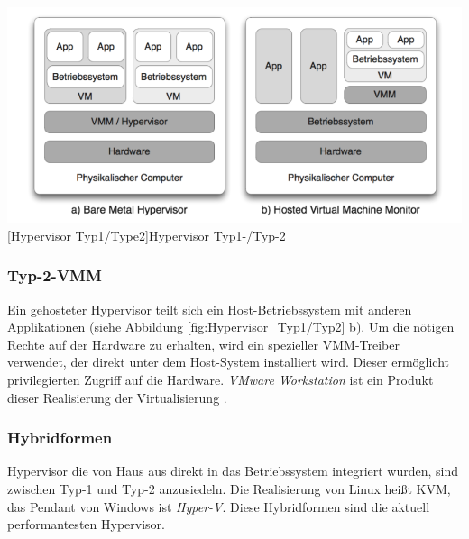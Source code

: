 \vspace{1em}
\begin{minipage}{\linewidth}
	\centering
	\includegraphics[width=1\linewidth]{pics/Hypervisoren.PNG}
	[Hypervisor Typ1/Type2]{Hypervisor Typ1-/Typ-2 \cite{Meinel2011VirtualisierungMarktubersicht} }
	\label{fig:Hypervisor_Typ1/Typ2}
\end{minipage}

\subsubsection{Typ-2-VMM}
Ein gehosteter Hypervisor teilt sich ein Host-Betriebssystem mit anderen Applikationen (siehe Abbildung \ref{fig:Hypervisor_Typ1/Typ2} b). Um die nötigen Rechte auf der Hardware zu erhalten, wird ein spezieller VMM-Treiber verwendet, der direkt unter dem Host-System installiert wird. Dieser ermöglicht privilegierten Zugriff auf die Hardware. \emph{VMware Workstation} ist ein Produkt dieser Realisierung der Virtualisierung \cite{Glatz2015Betriebssysteme}.

\subsubsection{Hybridformen}
Hypervisor die von Haus aus direkt in das Betriebssystem integriert wurden, sind zwischen Typ-1 und Typ-2 anzusiedeln. Die Realisierung von Linux heißt \ac{KVM}, das Pendant von Windows ist \emph{Hyper-V}. Diese Hybridformen sind die aktuell performantesten Hypervisor. 

